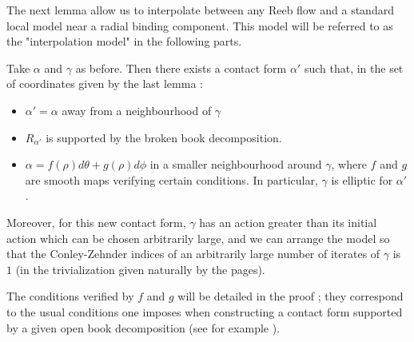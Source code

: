 \documentclass[../main.tex]{subfiles}
\begin{document}
The next lemma allow us to interpolate between any Reeb flow and a standard local model near a radial binding component. This model will be referred to as the "interpolation model" in the following parts.

\begin{lemma}\label{l:radial_mod}
Take $\alpha$ and $\gamma$ as before. Then there exists a contact form $\alpha'$ such that, in the set of coordinates given by the last lemma :
\begin{itemize}
    \item $\alpha' = \alpha$ away from a neighbourhood of $\gamma$
    \item $R_{\alpha'}$ is supported by the broken book decomposition.
    \item $\alpha = f(\rho) d\theta + g(\rho) d\phi$ in a smaller neighbourhood around $\gamma$, where $f$ and $g$ are smooth maps verifying certain conditions. In particular, $\gamma$ is elliptic for $\alpha'$. 
\end{itemize}
Moreover, for this new contact form, $\gamma$ has an action greater than its initial action which can be chosen arbitrarily large, and we can arrange the model so that the Conley-Zehnder indices of an arbitrarily large number of iterates of $\gamma$ is $1$ (in the trivialization given naturally by the pages).
\end{lemma}

\begin{remark}
The conditions verified by $f$ and $g$ will be detailed in the proof ; they correspond to the usual conditions one imposes when constructing a contact form supported by a given open book decomposition (see for example \cite{wendl_open_2009}).
\end{remark}
\end{document}
